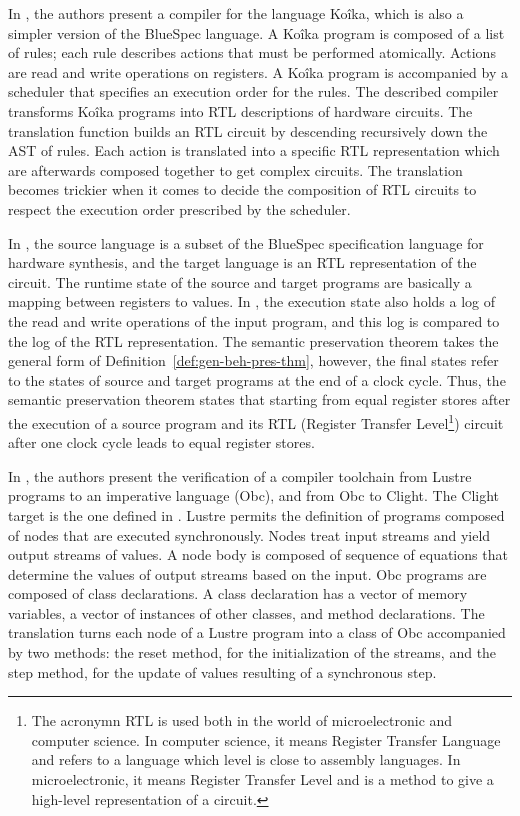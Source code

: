 \documentclass[pdflatex,sn-mathphys]{sn-jnl}%
\theoremstyle{thmstyleone}%
\theoremstyle{thmstyletwo}%
\theoremstyle{thmstylethree}%
\begin{document}
In \cite{Bourgeat2020}, the authors present a compiler for the
language Koîka, which is also a simpler version of the BlueSpec
language. A Koîka program is composed of a list of rules; each rule
describes actions that must be performed atomically. Actions are read
and write operations on registers. A Koîka program is accompanied by a
scheduler that specifies an execution order for the rules. The
described compiler transforms Koîka programs into RTL descriptions of
hardware circuits. The translation function builds an RTL circuit by
descending recursively down the AST of rules. Each action is
translated into a specific RTL representation which are afterwards
composed together to get complex circuits. The translation becomes
trickier when it comes to decide the composition of RTL circuits to
respect the execution order prescribed by the scheduler.

In \cite{Bourgeat2020,Braibant2013}, the source language is a subset
of the BlueSpec specification language for hardware synthesis, and the
target language is an RTL representation of the circuit. The runtime
state of the source and target programs are basically a mapping
between registers to values. In \cite{Bourgeat2020}, the execution
state also holds a log of the read and write operations of the input
program, and this log is compared to the log of the RTL
representation. The semantic preservation theorem takes the general
form of Definition~\ref{def:gen-beh-pres-thm}, however, the final
states refer to the states of source and target programs at the end of
a clock cycle. Thus, the semantic preservation theorem states that
starting from equal register stores after the execution of a source
program and its RTL (Register Transfer Level\footnote{The acronymn RTL
  is used both in the world of microelectronic and computer
  science. In computer science, it means Register Transfer Language
  and refers to a language which level is close to assembly
  languages. In microelectronic, it means Register Transfer Level and
  is a method to give a high-level representation of a circuit.})
circuit after one clock cycle leads to equal register stores.

In \cite{Bourke}, the authors present the verification of a compiler
toolchain from \textsf{Lustre} programs to an imperative language
(Obc), and from Obc to Clight.  The Clight target is the one defined
in \ccert{} \cite{Leroy2009}.  \textsf{Lustre} permits the definition
of programs composed of nodes that are executed synchronously.  Nodes
treat input streams and yield output streams of values.  A node body
is composed of sequence of equations that determine the values of
output streams based on the input.  Obc programs are composed of class
declarations. A class declaration has a vector of memory variables, a
vector of instances of other classes, and method declarations.  The
translation turns each node of a \textsf{Lustre} program into a class
of Obc accompanied by two methods: the reset method, for the
initialization of the streams, and the step method, for the update of
values resulting of a synchronous step.
\end{document}
